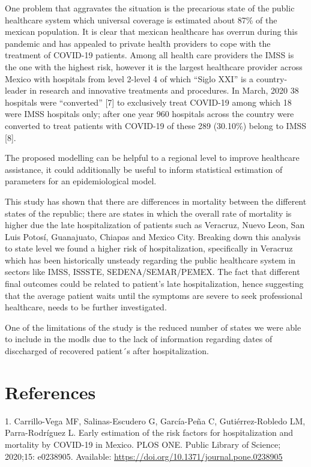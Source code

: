 \documentclass[10pt,letterpaper]{article}
\begin{document}
One problem that aggravates the situation is the precarious state of the
public healthcare system which universal coverage is estimated about
87\% of the mexican population. It is clear that mexican healthcare has
overrun during this pandemic and has appealed to private health
providers to cope with the treatment of COVID-19 patients. Among all
health care providers the IMSS is the one with the highest risk, however
it is the largest healthcare provider across Mexico with hospitals from
level 2-level 4 of which ``Siglo XXI'' is a country-leader in research
and innovative treatments and procedures. In March, 2020 38 hospitals
were ``converted'' {[}7{]} to exclusively treat COVID-19 among which 18
were IMSS hospitals only; after one year 960 hospitals across the
country were converted to treat patients with COVID-19 of these 289
(30.10\%) belong to IMSS {[}8{]}.

The proposed modelling can be helpful to a regional level to improve
healthcare assistance, it could additionally be useful to inform
statistical estimation of parameters for an epidemiological model.

This study has shown that there are differences in mortality between the
different states of the republic; there are states in which the overall
rate of mortality is higher due the late hospitalization of patients
such as Veracruz, Nuevo Leon, San Luis Potosí, Guanajuato, Chiapas and
Mexico City. Breaking down this analysis to state level we found a
higher risk of hospitalization, specifically in Veracruz which has been
historically unsteady regarding the public healthcare system in sectors
like IMSS, ISSSTE, SEDENA/SEMAR/PEMEX. The fact that different final
outcomes could be related to patient's late hospitalization, hence
suggesting that the average patient waits until the symptoms are severe
to seek professional healthcare, needs to be further investigated.

One of the limitations of the study is the reduced number of states we
were able to include in the modls due to the lack of information
regarding dates of disccharged of recovered patient´s after
hospitalization.

\section*{References}\label{references}

\hypertarget{refs}{}
\hypertarget{ref-Carrillo-Vega2020}{}
1. Carrillo-Vega MF, Salinas-Escudero G, García-Peña C,
Gutiérrez-Robledo LM, Parra-Rodríguez L. Early estimation of the risk
factors for hospitalization and mortality by COVID-19 in Mexico. PLOS
ONE. Public Library of Science; 2020;15: e0238905. Available:
\url{https://doi.org/10.1371/journal.pone.0238905}
\end{document}
